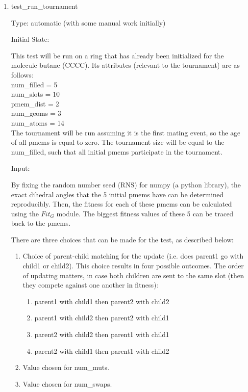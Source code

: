 \documentclass[12pt, titlepage]{article}
\begin{document}
\begin{enumerate}
	
\item{test\_run\_tournament\\}

Type: automatic (with some manual work initially)

Initial State:

This test will be run on a ring that has already been initialized for the 
molecule butane (CCCC). Its attributes (relevant to the tournament) are as 
follows:\\

num\_filled = 5\\
num\_slots = 10\\
pmem\_dist = 2\\
num\_geoms = 3\\
num\_atoms = 14\\

The tournament will be run assuming it is the first mating event, so the age of 
all pmems is equal to zero. The tournament size will be equal to the 
num\_filled, such that all initial pmems participate in the tournament.

Input: 

By fixing the random number seed (RNS) for numpy (a python library), the exact 
dihedral angles that the 5 initial pmems have can be determined reproducibly. 
Then, the fitness for each of these pmems can be calculated using the $Fit_G$ 
module. The biggest fitness values of these 5 can be traced back to the pmems.

There are three choices that can be made for the test, as described below:

\begin{enumerate}
	\item Choice of parent-child matching for the update (i.e. does parent1 go 
	with child1 or child2). This choice results in four possible outcomes. The 
	order of updating matters, in case both children are sent to the same slot 
	(then they compete against one another in fitness):
	\begin{enumerate}
		\item parent1 with child1 then parent2 with child2
		\item parent1 with child2 then parent2 with child1
		\item parent2 with child2 then parent1 with child1
		\item parent2 with child1 then parent1 with child2
	\end{enumerate}
	\item Value chosen for num\_muts.
	\item Value chosen for num\_swaps.
\end{enumerate}


\end{enumerate}
\end{document}
